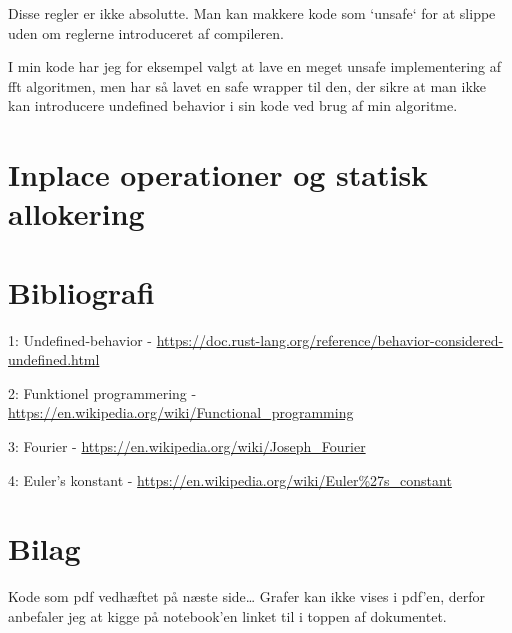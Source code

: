 \documentclass[11pt,a4paper]{article}
\begin{document}
\bigskip

Disse regler er ikke absolutte. Man kan makkere kode som `unsafe` for at slippe uden om reglerne introduceret af compileren.

I min kode har jeg for eksempel valgt at lave en meget unsafe implementering af fft algoritmen,
men har så lavet en safe wrapper til den, der sikre at man ikke kan introducere undefined behavior i sin kode ved brug af min algoritme.

\section{Inplace operationer og statisk allokering}
\label{sec:orgdbb4489}



\section{Bibliografi}
\label{sec:org5c13791}

1: Undefined-behavior - \url{https://doc.rust-lang.org/reference/behavior-considered-undefined.html}

2: Funktionel programmering - \url{https://en.wikipedia.org/wiki/Functional\_programming}

3: Fourier - \url{https://en.wikipedia.org/wiki/Joseph\_Fourier}

4: Euler's konstant - \url{https://en.wikipedia.org/wiki/Euler\%27s\_constant}


\section{Bilag}
\label{sec:org499d1ca}

Kode som pdf vedhæftet på næste side\ldots{}
Grafer kan ikke vises i pdf'en, derfor anbefaler jeg at kigge på notebook'en linket til i toppen af dokumentet.


\end{document}
